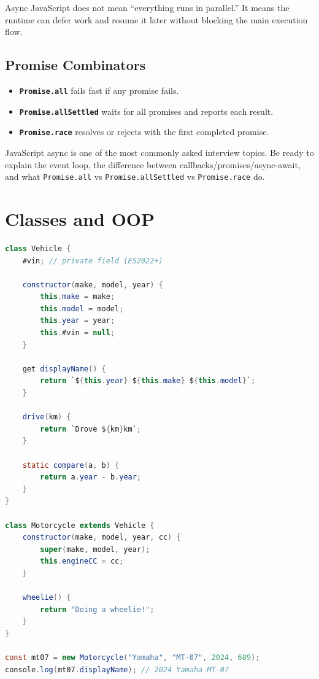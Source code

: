 \documentclass[12pt, a4paper, oneside]{book}
\begin{document}
\begin{warningbox}
Async JavaScript does not mean ``everything runs in parallel.'' It means the runtime can defer work and resume it later without blocking the main execution flow.
\end{warningbox}

\subsection{Promise Combinators}

\begin{itemize}[leftmargin=2em]
    \item \textbf{\texttt{Promise.all}} fails fast if any promise fails.
    \item \textbf{\texttt{Promise.allSettled}} waits for all promises and reports each result.
    \item \textbf{\texttt{Promise.race}} resolves or rejects with the first completed promise.
\end{itemize}

\begin{interviewbox}
JavaScript async is one of the most commonly asked interview topics. Be ready to explain the event loop, the difference between callbacks/promises/async-await, and what \texttt{Promise.all} vs \texttt{Promise.allSettled} vs \texttt{Promise.race} do.
\end{interviewbox}

\section{Classes and OOP}

\begin{lstlisting}[language=Java, caption={JavaScript classes}]
class Vehicle {
    #vin; // private field (ES2022+)

    constructor(make, model, year) {
        this.make = make;
        this.model = model;
        this.year = year;
        this.#vin = null;
    }

    get displayName() {
        return `${this.year} ${this.make} ${this.model}`;
    }

    drive(km) {
        return `Drove ${km}km`;
    }

    static compare(a, b) {
        return a.year - b.year;
    }
}

class Motorcycle extends Vehicle {
    constructor(make, model, year, cc) {
        super(make, model, year);
        this.engineCC = cc;
    }

    wheelie() {
        return "Doing a wheelie!";
    }
}

const mt07 = new Motorcycle("Yamaha", "MT-07", 2024, 689);
console.log(mt07.displayName); // 2024 Yamaha MT-07
\end{lstlisting}
\end{document}
